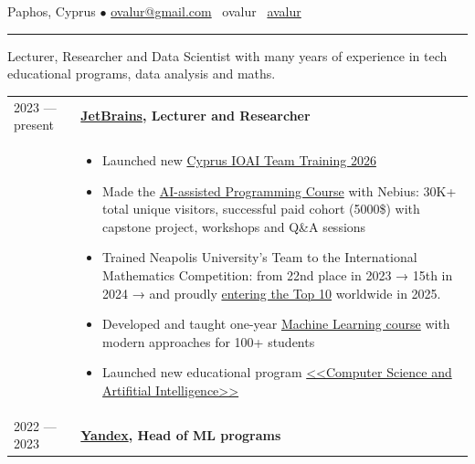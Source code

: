 \documentclass[11pt]{article}
\begin{document}
%

\vspace{0.5em}

\noindent Paphos, Cyprus $\bullet$ \href{mailto:ovalur@gmail.com}{ovalur@gmail.com} \faSendO~ovalur
\faGithub~\href{https://github.com/avalur}{avalur}

\vspace{0.5em}
\hrule
\vspace{0.5em}

Lecturer, Researcher and Data Scientist with many years of experience in
tech educational programs, data analysis and maths.

\vspace{0.5em}
\begin{longtable} {l | p{}}
2023 — present & {\textbf{\href{https://jetbrains.com}{JetBrains}, Lecturer and Researcher}} \\
& \vspace{-1.5em} 
	\begin{itemize}
		\item Launched new \href{https://lp.jetbrains.com/academy/cyprus-ioai-training/}{Cyprus IOAI Team Training 2026}
		\item Made the \href{https://futurecoding.ai/}{AI-assisted Programming Course} with Nebius: 30K+ total unique visitors,
        successful paid cohort (5000\$) with capstone project, workshops and Q\&A sessions
		\item Trained Neapolis University's Team to the International Mathematics Competition:
		from 22nd place in 2023 → 15th in 2024 → and proudly \href{https://www.linkedin.com/posts/aleksandr-avdiushenko_techne-notes-activity-7357816957242380289-GWBs}{entering the Top 10} worldwide in 2025.
		\item Developed and taught one-year \href{https://avalur.github.io/mlcourse/index.html}{Machine Learning course} with
		modern approaches for 100+ students
		\item Launched new educational program \href{https://blog.jetbrains.com/education/2023/05/03/introducing-the-computer-science-and-artificial-intelligence-bachelor-s-program-with-neapolis-university-paphos/}{<<Computer Science and Artifitial Intelligence>>}
	\end{itemize} \\
2022 — 2023 & {\textbf{\href{https://ya.ru/}{Yandex}, Head of ML programs}} \\

\end{longtable}
\end{document}
